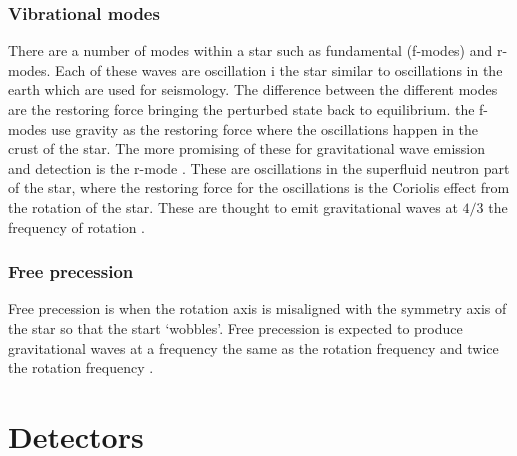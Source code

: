  \subsubsection{Vibrational modes}
There are a number of modes within a star such as fundamental (f-modes) and r-modes. 
Each of these waves are oscillation i the star similar to oscillations in the earth which are used for seismology.
The difference between the different modes are the restoring force bringing the perturbed state back to equilibrium.
the f-modes use gravity as the restoring force where the oscillations happen in the crust of the star.
The more promising of these for gravitational wave emission and detection is the r-mode \citep{Becker2009}.
These are oscillations in the superfluid neutron part of the star,
where the restoring force for the oscillations is the Coriolis effect from the rotation of the star.
These are thought to emit gravitational waves at $4/3$ the frequency of rotation \citep{Becker2009}.

\subsubsection{Free precession}

Free precession is when the rotation axis is misaligned with the symmetry axis of the star so that the start `wobbles'. 
Free precession is expected to produce gravitational waves at a frequency the same as the rotation frequency and twice the rotation frequency \citep{Becker2009}. 


\section{\label{intro:detector}Detectors}


